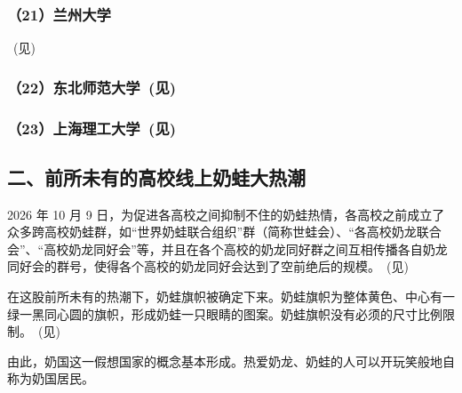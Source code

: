 

\clearpage
\subsubsection{（21）兰州大学}~(见)



\subsubsection[（22）东北师范大学]{（22）东北师范大学~(见)}



\subsubsection[（23）上海理工大学]{（23）上海理工大学~(见)}



\clearpage
\subsection{二、前所未有的高校线上奶蛙大热潮}

2026 年 10 月 9 日，为促进各高校之间抑制不住的奶蛙热情，各高校之前成立了众多跨高校奶蛙群，如“世界奶蛙联合组织”群（简称世蛙会）、“各高校奶龙联合会”、“高校奶龙同好会”等，并且在各个高校的奶龙同好群之间互相传播各自奶龙同好会的群号，使得各个高校的奶龙同好会达到了空前绝后的规模。~(见)



在这股前所未有的热潮下，奶蛙旗帜被确定下来。奶蛙旗帜为整体黄色、中心有一绿一黑同心圆的旗帜，形成奶蛙一只眼睛的图案。奶蛙旗帜没有必须的尺寸比例限制。~(见)



由此，奶国这一假想国家的概念基本形成。热爱奶龙、奶蛙的人可以开玩笑般地自称为奶国居民。

\clearpage


\clearpage



